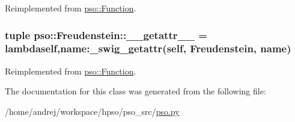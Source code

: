 Reimplemented from \hyperlink{classpso_1_1Function_5bddc07dbaab0ee579488bdcc8103a71}{pso::Function}.\hypertarget{classpso_1_1Freudenstein_6ceb435fb356ceecdc0358b41551b3ce}{
\subsubsection{\setlength{\rightskip}{0pt plus 5cm}tuple {\bf pso::Freudenstein::\_\-\_\-getattr\_\-\_\-} = lambdaself,name:\_\-swig\_\-getattr(self, {\bf Freudenstein}, name)}}
\label{classpso_1_1Freudenstein_6ceb435fb356ceecdc0358b41551b3ce}




Reimplemented from \hyperlink{classpso_1_1Function_affeed856b337656e88895fa35321496}{pso::Function}.

The documentation for this class was generated from the following file:\begin{CompactItemize}
\item 
/home/andrej/workspace/hpso/pso\_\-src/\hyperlink{pso_8py}{pso.py}\end{CompactItemize}
